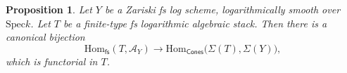 \documentclass{article}
\newtheorem{proposition}[definition]{Proposition}
\begin{document}




\begin{proposition}\label{prop:improved-2.10-ACGSI}
Let $Y$ be a Zariski fs log scheme, logarithmically smooth over
$\mathrm{Spec} k$. Let $T$ be a finite-type fs logarithmic algebraic stack.
Then there is a canonical bijection
\[
\mathrm{Hom}_{\mathsf{fs}}(T,\mathcal{A}_Y)
\longrightarrow
\mathrm{Hom}_{\mathsf{Cones}}\bigl(\Sigma(T),\Sigma(Y)\bigr),
\]
which is functorial in $T$.
\end{proposition}
\end{document}
